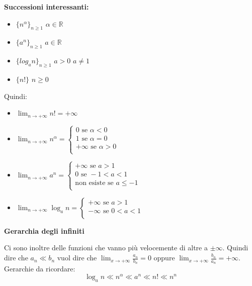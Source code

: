\textbf{\large{Successioni interessanti:}}%

\begin{itemize}
    \item[] $\{n^\alpha\}_{n\geq1}$ $\alpha\in\mathbb{R}$
    \item[] $\{a^n\}_{n\geq1}$ $a\in\mathbb{R}$
    \item[] $\{log_an\}_{n\geq1}$ $a>0$ $a\neq 1$
    \item[] $\{n!\}$ $n\geq0$
\end{itemize}
Quindi:
\begin{itemize}
    \item[] $\lim_{n\to+\infty}n!=+\infty$
    \item[] $\lim_{n\to+\infty}n^\alpha=\begin{cases}
                0 \text{ se } \alpha<0\\
                1 \text{ se } \alpha=0\\
                +\infty \text{ se } \alpha>0\\
            \end{cases}$
    \item[] $\lim_{n\to+\infty}a^n=\begin{cases}
                +\infty \text{ se } a>1\\
                0 \text{ se } -1<a<1\\
                \text{non esiste se } a\leq-1\\
            \end{cases}$
    \item[] $\lim_{n\to+\infty}\log_an=\begin{cases}
                +\infty \text{ se } a>1\\
                -\infty \text{ se } 0<a<1\\
            \end{cases}$
\end{itemize}

\textbf{\large{Gerarchia degli infiniti}}

Ci sono inoltre delle funzioni che vanno più velocemente di altre a $\pm\infty$.
Quindi dire che $a_n\ll b_n$ vuol dire che $\lim_{x\to+\infty}\frac{a_n}{b_n}=0$ oppure $\lim_{x\to+\infty}\frac{b_n}{a_n}=+\infty$.
Gerarchie da ricordare:
\begin{equation*}
    \log_an\ll n^\alpha\ll a^n\ll n!\ll n^n
\end{equation*}


